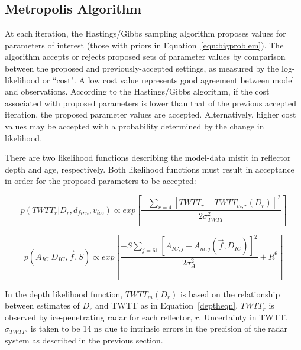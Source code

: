 \subsection{Metropolis Algorithm}\label{metrop}
At each iteration, the Hastings/Gibbs sampling algorithm \citep{hastings1970,gelfand1992} proposes values for parameters of interest (those with priors in Equation~\ref{eqn:bigproblem}). The algorithm accepts or rejects proposed sets of parameter values by comparison between the proposed and previously-accepted settings, as measured by the log-likelihood or ``cost". A low cost value represents good agreement between model and observations. According to the Hastings/Gibbs algorithm, if the cost associated with proposed parameters is lower than that of the previous accepted iteration, the proposed parameter values are accepted. Alternatively, higher cost values may be accepted with a probability determined by the change in likelihood.


There are two likelihood functions describing the model-data misfit in reflector depth and age, respectively. Both likelihood functions must result in acceptance in order for the proposed parameters to be accepted:

\begin{equation}\label{eqn:loglikedepth}
p(TWTT_r | D_r,d_{firn},v_{ice} ) \propto exp[\frac{-\sum_{r=4}[TWTT_{r} - TWTT_{m,r}(D_r)]^2}{2\sigma_{TWTT}^2}]
\end{equation}

\begin{equation}\label{eqn:loglikeage}
p(A_{IC} | D_{IC},\vec{f},S) \propto exp[\frac{-S\sum_{j = 61}[A_{IC,j} - A_{m,j}(\vec{f},D_{IC})]^2}{2\sigma_A^2} + R^6]
\end{equation}


In the depth likelihood function, $TWTT_m(D_r)$ is based on the relationship between estimates of $D_r$ and TWTT as in Equation~\ref{deptheqn}. $TWTT_r$ is observed by ice-penetrating radar for each reflector, $r$. Uncertainty in TWTT, $\sigma_{TWTT}$, is taken to be 14 ns due to intrinsic errors in the precision of the radar system as described in the previous section.



